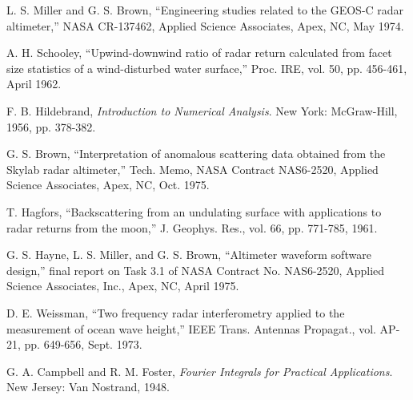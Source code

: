 {\noindent[10] L. S. Miller and G. S. Brown, ``Engineering studies related to the GEOS-C radar altimeter,'' NASA CR-137462, Applied Science Associates, Apex, NC, May 1974.\par
\noindent[11] A. H. Schooley, ``Upwind-downwind ratio of radar return calculated from facet size statistics of a wind-disturbed water surface,'' Proc. IRE, vol. 50, pp. 456-461, April 1962.\par
\noindent[12] F. B. Hildebrand, \emph{Introduction to Numerical Analysis}. New York: McGraw-Hill, 1956, pp. 378-382.\par
\noindent[13] G. S. Brown, ``Interpretation of anomalous scattering data obtained from the Skylab radar altimeter,'' Tech. Memo, NASA Contract NAS6-2520, Applied Science Associates, Apex, NC, Oct. 1975.\par
\noindent[14] T. Hagfors, ``Backscattering from an undulating surface with applications to radar returns from the moon,'' J. Geophys. Res., vol. 66, pp. 771-785, 1961.\par
\noindent[15] G. S. Hayne, L. S. Miller, and G. S. Brown, ``Altimeter waveform software design,'' final report on Task 3.1 of NASA Contract No. NAS6-2520, Applied Science Associates, Inc., Apex, NC, April 1975.\par
\noindent[16] D. E. Weissman, ``Two frequency radar interferometry applied to the measurement of ocean wave height,'' IEEE Trans. Antennas Propagat., vol. AP-21, pp. 649-656, Sept. 1973.\par
\noindent[17] G. A. Campbell and R. M. Foster, \emph{Fourier Integrals for Practical Applications}. New Jersey: Van Nostrand, 1948.\par
}
